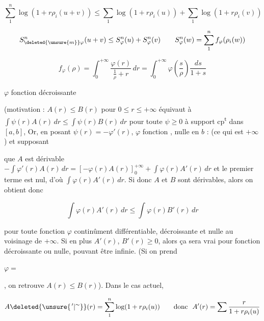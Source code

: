 
\[
\sum_1^n\log(1+r\rho_i(u+v))\leq\sum_1\log(1+r\rho_i(u))+\sum_1\log(1+r\rho_i(v))
\]

\[
S_{\deleted{\unsure{m}}\varphi}^{n}(u+v)\leq S_\varphi^n(u)+S_\varphi^n(v)\qquad S_\varphi^n(w)=\sum_1^n f_\varphi(\rho_i(w))
\]

\[
f_\varphi(\rho)=\int_0^{+\infty}\frac{\varphi(r)}{\frac1\rho+r}\,dr=\int_0^{+\infty}\varphi\left(\frac s\rho\right)\frac{ds}{1+s}
\]

$\varphi$ fonction décroissante

(motivation :  $A(r)\leq B(r)$ pour $0\leq r\leq+\infty$ équivaut à $\int\psi(r)A(r)\,dr\leq\int\psi(r)B(r)\,dr$ pour toute $\psi\geq0$ à support cp\textsuperscript{t} dans $[a,b]$, Or, en posant $\psi(r)=-\varphi'(r)$, $\varphi$ fonction  , nulle en $b$ :    (ce qui est $+\infty$) et supposant 

que $A$ est dérivable $-\int\varphi'(r)A(r)\,dr=[-\varphi(r)A(r)]_0^{+\infty}+\int\varphi(r)A'(r)\,dr$ et le premier terme est nul, d'où $\int\varphi(r)A'(r)\,dr$. Si donc $A$ et $B$ sont dérivables, alors on obtient donc

\[
\int\varphi(r)A'(r)\,dr\leq\int\varphi(r)B'(r)\,dr
\]

pour toute fonction $\varphi$ continûment différentiable, décroissante \inserted{sur $[0,+\infty[$} et nulle au voisinage de $+\infty$. Si en plus $A'(r)$, $B'(r)\geq0$, alors ça sera vrai pour  fonction décroissante  ou nulle, pouvant être infinie. (Si on prend

$\varphi=$


, on retrouve $A(r)\leq B(r)$). Dans le cas actuel,

\[
A\deleted{\unsure{^{\,\prime}|{}^{\sim}}}(r)=\sum_1^n\log(1+r\rho_i(u))\qquad \text{donc }\ A'(r)=\sum\frac{r}{1+r\rho_i(u)}
\]

